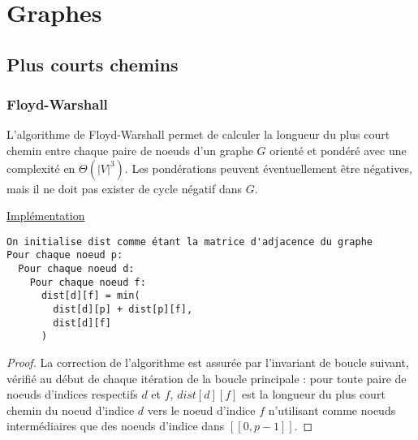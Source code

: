 \documentclass[11pt,a4paper]{article}
\begin{document}
\section{Graphes}

  \subsection{Plus courts chemins}

    \subsubsection{Floyd-Warshall}

L'algorithme de Floyd-Warshall permet de calculer la longueur du plus court chemin entre chaque paire de noeuds d'un graphe \(G\) orienté et pondéré avec une complexité en \(\Theta(|V|^3)\). Les pondérations peuvent éventuellement être négatives, mais il ne doit pas exister de cycle négatif dans \(G\).

\noindent\href{https://github.com/AdrienVannson/algo-lib/blob/master/include/graphs/algorithms/floyd-warshall.hpp}{Implémentation}
\begin{lstlisting}
On initialise dist comme étant la matrice d'adjacence du graphe
Pour chaque noeud p:
  Pour chaque noeud d:
    Pour chaque noeud f:
      dist[d][f] = min(
        dist[d][p] + dist[p][f],
        dist[d][f]
      )
\end{lstlisting}

\begin{proof}
La correction de l'algorithme est assurée par l'invariant de boucle suivant, vérifié au début de chaque itération de la boucle principale : pour toute paire de noeuds d'indices respectifs \(d\) et \(f\), \(dist[d][f]\) est la longueur du plus court chemin du noeud d'indice \(d\) vers le noeud d'indice \(f\) n'utilisant comme noeuds intermédiaires que des noeuds d'indice dans \( [\![0, p-1]\!] \).
\end{proof}
\end{document}
